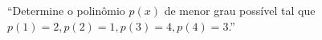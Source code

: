\enquote{Determine o polinômio $p(x)$ de menor grau possível tal que $p(1) = 2, p(2) = 1, p(3) = 4, p(4) = 3$.}
